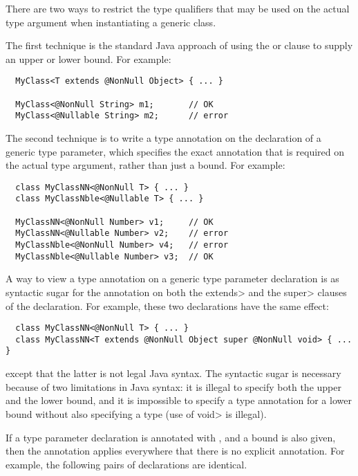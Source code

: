 There are two ways to restrict the type qualifiers that may be used on
the actual type argument when instantiating a generic class.

The first technique is the standard Java approach of using the
 or  clause to supply an upper or lower bound.
For example:

\begin{Verbatim}
  MyClass<T extends @NonNull Object> { ... }

  MyClass<@NonNull String> m1;       // OK
  MyClass<@Nullable String> m2;      // error
\end{Verbatim}

The second technique is to write a type annotation on the declaration of a
generic type parameter, which specifies the exact annotation that is
required on the actual type argument, rather than just a bound.  For example:

\begin{Verbatim}
  class MyClassNN<@NonNull T> { ... }
  class MyClassNble<@Nullable T> { ... }

  MyClassNN<@NonNull Number> v1;     // OK
  MyClassNN<@Nullable Number> v2;    // error
  MyClassNble<@NonNull Number> v4;   // error
  MyClassNble<@Nullable Number> v3;  // OK
\end{Verbatim}

A way to view a type annotation on a generic type parameter declaration is
as syntactic sugar for the annotation on both the \<extends> and the
\<super> clauses of the declaration.  For example, these two declarations
have the same effect:

\begin{Verbatim}
  class MyClassNN<@NonNull T> { ... }
  class MyClassNN<T extends @NonNull Object super @NonNull void> { ... }
\end{Verbatim}

\noindent
except that the latter is not legal Java syntax.  The syntactic sugar is
necessary because of two limitations in Java syntax:  it is illegal to
specify both the upper and the
lower bound, and it is impossible to specify a type annotation for a lower
bound without also specifying a type (use of \<void> is illegal).

If a type parameter declaration is annotated with , and a bound is
also given, then the annotation applies everywhere that there is no
explicit annotation.  For example, the following pairs of declarations are
identical.

